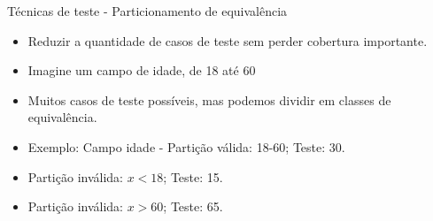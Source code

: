 
\begin{frame}{Técnicas de teste - Particionamento de equivalência}
    \begin{itemize}
        \item Reduzir a quantidade de casos de teste sem perder cobertura importante.
        \item Imagine um campo de idade, de 18 até 60
        \item Muitos casos de teste possíveis, mas podemos dividir em classes de equivalência.
        \item Exemplo: Campo idade - Partição válida: 18-60; Teste: 30.
        \item Partição inválida: $x < 18$; Teste: 15.
        \item Partição inválida: $x > 60$; Teste: 65.
    \end{itemize}
\end{frame}